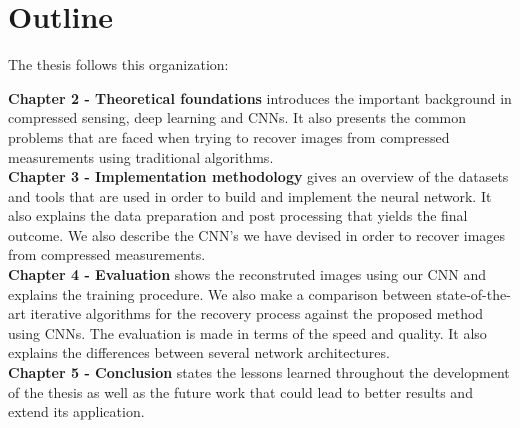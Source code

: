 \section{Outline}
The thesis follows this organization: \

{\bfseries Chapter 2 - Theoretical foundations}  introduces the important background in compressed sensing, deep learning and CNNs. It also presents the common problems that are faced when trying to recover images from compressed measurements using traditional algorithms. \\
{\bfseries Chapter 3 - Implementation methodology} gives an overview of the datasets and tools that are used in order to build and implement the neural network. It also explains the data preparation and post processing that yields the final outcome. We also describe the CNN's we have devised in order to recover images from compressed measurements. \\
{\bfseries Chapter 4 - Evaluation} shows the reconstruted images using our CNN and explains the training procedure. We also make a comparison between state-of-the-art iterative algorithms for the recovery process against the proposed method using CNNs. The evaluation is made in terms of the speed and quality. It also explains the differences between several network architectures.  \\
{\bfseries Chapter 5 - Conclusion} states the lessons learned throughout the development of the thesis as well as the future work that could lead to better results and extend its application. \\
